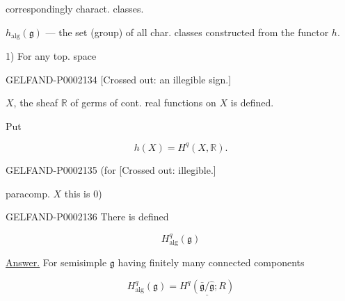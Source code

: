 correspondingly charact. classes.



$h_{\mathrm{alg}}(\mathfrak g)$ --- the set (group) of all char. classes constructed from the functor $h$.



1) For any top. space



\begin{GelfandAdjacentEvidence}{GELFAND-P000213}{4}
[Crossed out: an illegible sign.]
\end{GelfandAdjacentEvidence}

$X$, the sheaf $\mathbb R$ of germs of cont. real functions on $X$ is defined.



Put



\begin{equation*}h (X)=H^q (X,\mathbb R).\end{equation*}



\begin{GelfandAdjacentEvidence}{GELFAND-P000213}{5}
(for [Crossed out: illegible.]
\end{GelfandAdjacentEvidence}

paracomp. $X$ this is $0$)



\begin{GelfandAdjacentEvidence}{GELFAND-P000213}{6}
There is defined



\begin{equation*}H_{\mathrm{alg}}^q (\mathfrak g)\end{equation*}



\underline{\underline{Answer.}} For semisimple $\mathfrak g$ having finitely many connected components



\begin{equation*}H_{\mathrm{alg}}^q (\mathfrak g)=\underline{H^q (\bar{\mathfrak g}/\hat{\mathfrak g}; R)}\end{equation*}
\end{GelfandAdjacentEvidence}


